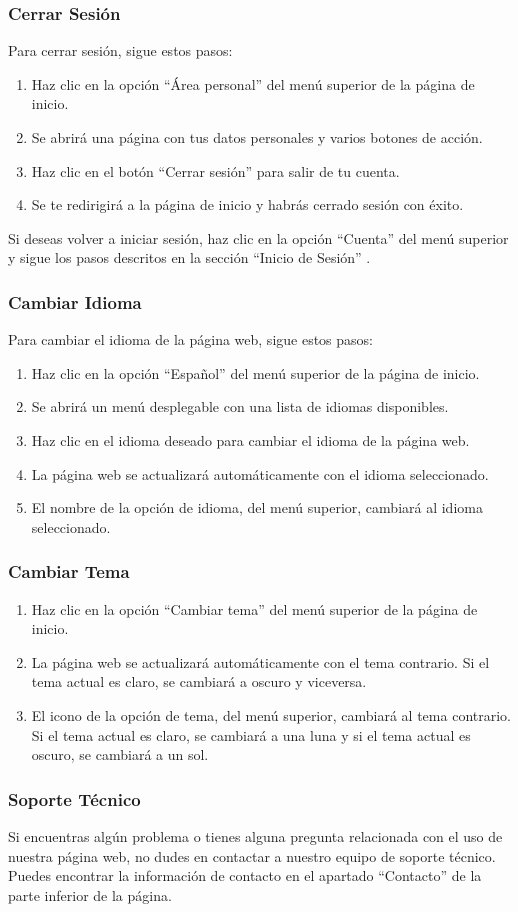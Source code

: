 \subsubsection{Cerrar Sesión}
Para cerrar sesión, sigue estos pasos:
\begin{enumerate}
	\item Haz clic en la opción “Área personal” del menú superior de la página de inicio.
	\item Se abrirá una página con tus datos personales y varios botones de acción.
	\item Haz clic en el botón “Cerrar sesión” para salir de tu cuenta.
	\item Se te redirigirá a la página de inicio y habrás cerrado sesión con éxito.
\end{enumerate}
Si deseas volver a iniciar sesión, haz clic en la opción “Cuenta” del menú superior y sigue los pasos descritos en la sección “Inicio de Sesión” .

\subsubsection{Cambiar Idioma}
Para cambiar el idioma de la página web, sigue estos pasos:
\begin{enumerate}
	\item Haz clic en la opción “Español” del menú superior de la página de inicio.
	\item Se abrirá un menú desplegable con una lista de idiomas disponibles.
	\item Haz clic en el idioma deseado para cambiar el idioma de la página web.
	\item La página web se actualizará automáticamente con el idioma seleccionado.
	\item El nombre de la opción de idioma, del menú superior, cambiará al idioma seleccionado.
\end{enumerate}

\subsubsection{Cambiar Tema}
\begin{enumerate}
	\item Haz clic en la opción “Cambiar tema” del menú superior de la página de inicio.
	\item La página web se actualizará automáticamente con el tema contrario. Si el tema actual es claro, se cambiará a oscuro y viceversa.
	\item El icono de la opción de tema, del menú superior, cambiará al tema contrario. Si el tema actual es claro, se cambiará a una luna y si el tema actual es oscuro, se cambiará a un sol.
\end{enumerate}

\subsubsection{Soporte Técnico}
Si encuentras algún problema o tienes alguna pregunta relacionada con el uso de nuestra página web, no dudes en contactar a nuestro equipo de soporte técnico. Puedes encontrar la información de contacto en el apartado “Contacto” de la parte inferior de la página.